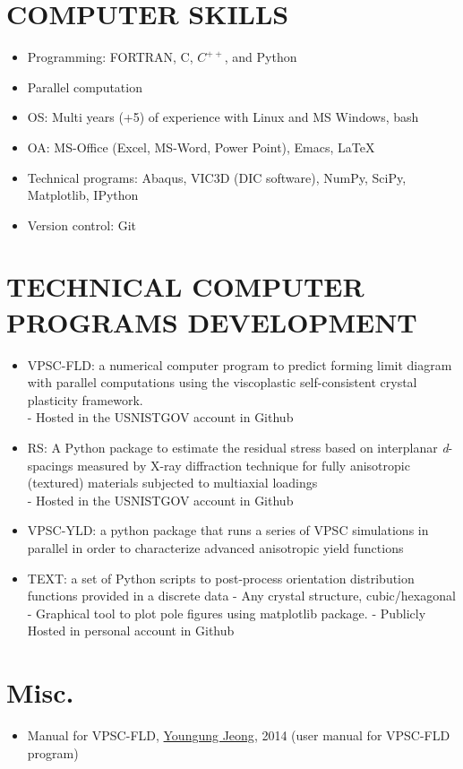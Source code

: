 \documentclass{res}
\begin{document}
\begin{resume}
  \section{COMPUTER SKILLS}
  \begin{itemize}
  \item Programming: FORTRAN, C, $C^{++}$, and Python
  \item Parallel computation
  \item OS: Multi years (+5) of experience with Linux and MS Windows, bash
  \item OA: MS-Office (Excel, MS-Word, Power Point), Emacs, \LaTeX
  \item Technical programs: Abaqus, VIC3D (DIC software), NumPy, SciPy, Matplotlib, IPython
  \item Version control: Git
  \end{itemize}



  \section{TECHNICAL COMPUTER PROGRAMS DEVELOPMENT}
  \begin{itemize}
  \item VPSC-FLD: a numerical computer program to predict forming limit diagram with parallel computations using the viscoplastic self-consistent crystal plasticity framework.\\
    - Hosted in the USNISTGOV account in Github
  \item RS: A Python package to estimate the residual stress based on interplanar \emph{d}-spacings measured by X-ray diffraction technique for fully anisotropic (textured) materials subjected to multiaxial loadings\\
    - Hosted in the USNISTGOV account in Github
  \item VPSC-YLD: a python package that runs a series of VPSC simulations in parallel in order to characterize advanced anisotropic yield functions
  \item TEXT: a set of Python scripts to post-process orientation distribution functions provided in a discrete data
    - Any crystal structure, cubic/hexagonal
    - Graphical tool to plot pole figures using matplotlib package.
    - Publicly Hosted in personal account in Github
  \end{itemize}

    \section{Misc.}
  \begin{itemize}
  \item Manual for VPSC-FLD, \underline{Youngung Jeong}, 2014 (user manual for VPSC-FLD program)
  \end{itemize}


\end{resume}
\end{document}
